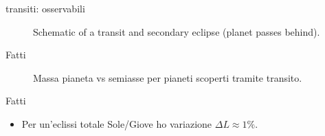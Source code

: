 \begin{wordonframe}{transiti: osservabili}
\begin{figure}[!ht]
\centering
\caption{Schematic of a transit and secondary eclipse (planet passes behind).}
\end{figure}
\end{wordonframe}

\begin{frame}{Fatti}
\begin{figure}[!ht]
\centering
\caption{Massa pianeta vs semiasse per pianeti scoperti tramite transito.}
\end{figure}
\end{frame}

\begin{wordonframe}{Fatti}
\begin{itemize}
    \item Per un'eclissi totale Sole/Giove ho variazione $\Delta L\approx1\%$.
\end{itemize}
\end{wordonframe}